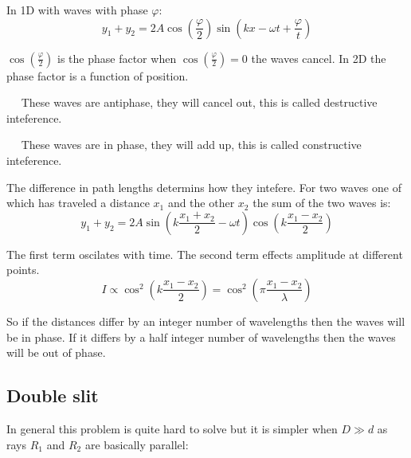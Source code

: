 \documentclass{article}
\begin{document}
In 1D with waves with phase \(\varphi\):
\[y_1+y_2=2A\cos\left(\frac{\varphi}{2}\right)\sin\left(kx-\omega t+\frac{\varphi}{t}\right)\]

\(\cos\left(\frac{\varphi}{2}\right)\) is the phase factor when \(\cos\left(\frac{\varphi}{2}\right)=0\) the waves cancel. In 2D the phase factor is a function of position.

~ ~These waves are antiphase, they will cancel out, this is called destructive inteference.

~ ~These waves are in phase, they will add up, this is called constructive inteference.

The difference in path lengths determins how they intefere. For two waves one of which has traveled a distance \(x_1\) and the other \(x_2\) the sum of the two waves is:
\[y_1+y_2=2A\sin\left(k\frac{x_1+x_2}{2}-\omega t\right)\cos\left(k\frac{x_1-x_2}{2}\right)\]

The first term oscilates with time. The second term effects amplitude at different points.
\[I\propto \cos^2\left(k\frac{x_1-x_2}{2}\right)=\cos^2\left(\pi\frac{x_1-x_2}{\lambda}\right)\]

So if the distances differ by an integer number of wavelengths then the waves will be in phase. If it differs by a half integer number of wavelengths then the waves will be out of phase.

\subsection*{Double slit}

\begin{center}
\end{center}

In general this problem is quite hard to solve but it is simpler when \(D\gg d\) as rays \(R_1\) and \(R_2\) are basically parallel:
\end{document}
